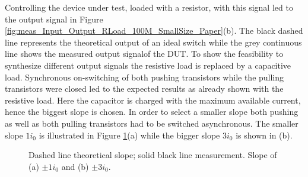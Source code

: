 \documentclass[journal]{IEEEtran}
\begin{document}
Controlling the device under test, loaded with a resistor, with this signal led to the output signal in Figure \ref{fig:meas_Input_Output_RLoad_100M_SmallSize_Paper}(b).
The black dashed line represents the theoretical output of an ideal switch while the grey continuous line shows the measured output signalof the DUT.
To show the feasibility to synthesize different output signals the resistive load is replaced by a capacitive load.
Synchronous on-switching of both pushing transistors while the pulling transistors were closed led to the expected results as already shown with the resistive load.
Here the capacitor is charged with the maximum available current, hence the biggest slope is chosen.
In order to select a smaller slope both pushing as well as both pulling transistors had to be switched asynchronous.
The smaller slope $1 i_0$ is illustrated in Figure \ref{fig:meas_Output_CLoad_100M_1io_3io}(a) while the bigger slope $3 i_0$ is shown in (b).
%
\begin{figure}[htb]
  \centering
	\begin{scriptsize}
  	\def\svgwidth{\columnwidth}
 	 
  	\caption{Dashed line theoretical slope; solid black line measurement. Slope of (a) $\pm 1  i_0$ and (b) $\pm 3 i_0$.}
  	\label{fig:meas_Output_CLoad_100M_1io_3io}
	\end{scriptsize}
\end{figure}
\end{document}
